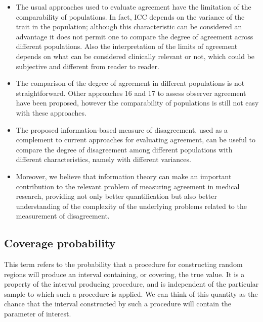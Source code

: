\documentclass[12pt, a4paper]{report}
\theoremstyle{plain}
\theoremstyle{definition}
\theoremstyle{remark}
\begin{document}
\begin{itemize}
		\item The usual approaches used to evaluate agreement have the limitation of the comparability of populations. In fact, ICC depends on the variance of the trait in the population; although this characteristic can be considered an advantage it does not permit one to compare the degree of agreement across different populations. Also the interpretation of the limits of agreement depends on what can be considered clinically relevant or not, which could be subjective and different from reader to reader. 
		
		\item The comparison of the degree of agreement in different populations is not straightforward. Other approaches 16 and 17 to assess observer agreement have been proposed, however the comparability of populations is still not easy with these approaches.
		
		\item The proposed information-based measure of disagreement, used as a complement to current approaches for evaluating agreement, can be useful to compare the degree of disagreement among different populations with different characteristics, namely with different variances.
		
		\item Moreover, we believe that information theory can make an important contribution to the relevant problem of measuring agreement in medical research, providing not only better quantification but also better understanding of the complexity of the underlying problems related to the measurement of disagreement.
	\end{itemize}
	


\subsection{Coverage probability}
This term refers to the probability that a procedure for 
constructing random regions will produce an interval containing, or covering, the 
true value. It is a property of the interval producing procedure, and is 
independent of the particular sample to which such a procedure is applied. We 
can think of this quantity as the chance that the interval constructed by such a 
procedure will contain the parameter of interest.

\end{document}
